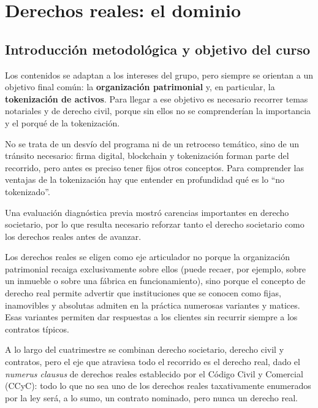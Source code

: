 \documentclass[12pt,oneside]{book}
\begin{document}
\chapter[El dominio]{Derechos reales: el dominio}

\section{Introducción metodológica y objetivo del curso}
\label{sec:introduccion}

Los contenidos se adaptan a los intereses del grupo, pero siempre se orientan a un objetivo final común: la \textbf{organización patrimonial} y, en particular, la \textbf{tokenización de activos}. Para llegar a ese objetivo es necesario recorrer temas notariales y de derecho civil, porque sin ellos no se comprenderían la importancia y el porqué de la tokenización.

No se trata de un desvío del programa ni de un retroceso temático, sino de un tránsito necesario: firma digital, blockchain y tokenización forman parte del recorrido, pero antes es preciso tener fijos otros conceptos. Para comprender las ventajas de la tokenización hay que entender en profundidad qué es lo ``no tokenizado''.

Una evaluación diagnóstica previa mostró carencias importantes en derecho societario, por lo que resulta necesario reforzar tanto el derecho societario como los derechos reales antes de avanzar.

Los derechos reales se eligen como eje articulador no porque la organización patrimonial recaiga exclusivamente sobre ellos (puede recaer, por ejemplo, sobre un inmueble o sobre una fábrica en funcionamiento), sino porque el concepto de derecho real permite advertir que instituciones que se conocen como fijas, inamovibles y absolutas admiten en la práctica numerosas variantes y matices. Esas variantes permiten dar respuestas a los clientes sin recurrir siempre a los contratos típicos.

\begin{note}
A lo largo del cuatrimestre se combinan derecho societario, derecho civil y contratos, pero el eje que atraviesa todo el recorrido es el derecho real, dado el \emph{numerus clausus} de derechos reales establecido por el Código Civil y Comercial (CCyC): todo lo que no sea uno de los derechos reales taxativamente enumerados por la ley será, a lo sumo, un contrato nominado, pero nunca un derecho real.
\end{note}
\end{document}

